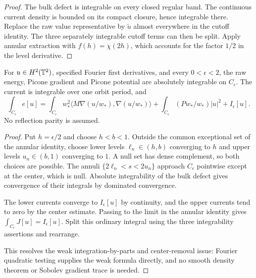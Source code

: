 \begin{proof}
\leanok
The bulk defect is integrable on every closed regular band.
The continuous current density is bounded on its compact closure,
hence integrable there. Replace the raw value representative by
$\widetilde u$ almost everywhere in the cutoff identity.
The three separately integrable cutoff terms can then be split.
Apply annular extraction with $f(h)=\chi(2h)$, which accounts for
the factor $1/2$ in the level derivative.
\end{proof}

\begin{lemma}
\label{lem:dd-truncated-picone}
\leanok
For $u\in H^2(\mathbb{T}^2)$, specified Fourier first derivatives, and every
$0<\epsilon<2$, the raw energy, Picone gradient and Picone potential
are absolutely integrable on $C_\epsilon$. The current is integrable over
one orbit period, and
\[
 \int_{C_\epsilon}e[u]
 =\int_{C_\epsilon}w_*^2\langle M\nabla(u/w_*),\nabla(u/w_*)\rangle
  +\int_{C_\epsilon}(Pw_*/w_*)|u|^2+I_\epsilon[u].
\]
No reflection parity is assumed.
\end{lemma}

\begin{proof}
\leanok
Put $h=\epsilon/2$ and choose $h<b<1$. Outside the common exceptional
set of the annular identity, choose lower levels $\ell_n\in(h,b)$
converging to $h$ and upper levels $u_n\in(b,1)$ converging to $1$.
A null set has dense complement, so both choices are possible.
The annuli $\{2\ell_n<s<2u_n\}$ approach $C_\epsilon$ pointwise
except at the center, which is null. Absolute integrability of the
bulk defect gives convergence of their integrals by dominated convergence.

The lower currents converge to $I_\epsilon[u]$ by continuity, and the
upper currents tend to zero by the center estimate. Passing to the limit
in the annular identity gives $\int_{C_\epsilon}J[u]=I_\epsilon[u]$.
Split this ordinary integral using the three integrability assertions
and rearrange.

This resolves the weak integration-by-parts and center-removal issue:
Fourier quadratic testing supplies the weak formula directly, and no
smooth density theorem or Sobolev gradient trace is needed.
\end{proof}


